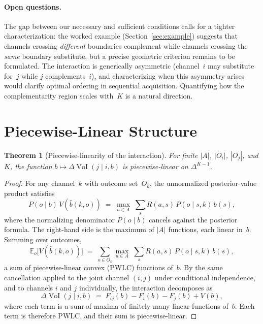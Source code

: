 \documentclass{article}
\newcommand{\VoI}{\operatorname{VoI}}
\newcommand{\bpost}{\hat{b}}
\newcommand{\E}{\mathbb{E}}
\newtheorem{theoremA}{Theorem}
\begin{document}
\paragraph{Open questions.}
The gap between our necessary and sufficient conditions calls for a tighter characterization: the worked example (Section~\ref{sec:example}) suggests that channels crossing \emph{different} boundaries complement while channels crossing the \emph{same} boundary substitute, but a precise geometric criterion remains to be formulated.
The interaction is generically asymmetric (channel~$i$ may substitute for~$j$ while $j$ complements~$i$), and characterizing when this asymmetry arises would clarify optimal ordering in sequential acquisition.
Quantifying how the complementarity region scales with~$K$ is a natural direction.





\clearpage
\appendix

\section{Piecewise-Linear Structure}
\label{app:polyhedral}

\begin{theoremA}[Piecewise-linearity of the interaction]
\label{prop:polyhedral}
For finite $|A|$, $|O_i|$, $|O_j|$, and $K$, the function $b \mapsto \Delta\VoI(j \mid i, b)$ is piecewise-linear on $\Delta^{K-1}$.
\end{theoremA}

\begin{proof}
For any channel~$k$ with outcome set~$O_k$, the unnormalized posterior-value product satisfies
\[
  P(o \mid b)\, V(\bpost(k, o))
  \;=\; \max_{a \in A}\; \sum_s R(a,s)\, P(o \mid s, k)\, b(s),
\]
where the normalizing denominator $P(o \mid b)$ cancels against the posterior formula.
The right-hand side is the maximum of $|A|$ functions, each linear in~$b$.
Summing over outcomes,
\[
  \E_o\bigl[V(\bpost(k, o))\bigr]
  \;=\;
  \sum_{o \in O_k} \max_{a \in A}\; \sum_s R(a,s)\, P(o \mid s, k)\, b(s),
\]
a sum of piecewise-linear convex (PWLC) functions of~$b$.
By the same cancellation applied to the joint channel $(i,j)$ under conditional independence, and to channels $i$ and $j$ individually, the interaction decomposes as
\[
  \Delta\VoI(j \mid i, b)
  \;=\; F_{ij}(b) - F_i(b) - F_j(b) + V(b),
\]
where each term is a sum of maxima of finitely many linear functions of~$b$.
Each term is therefore PWLC, and their sum is piecewise-linear.
\end{proof}
\end{document}
